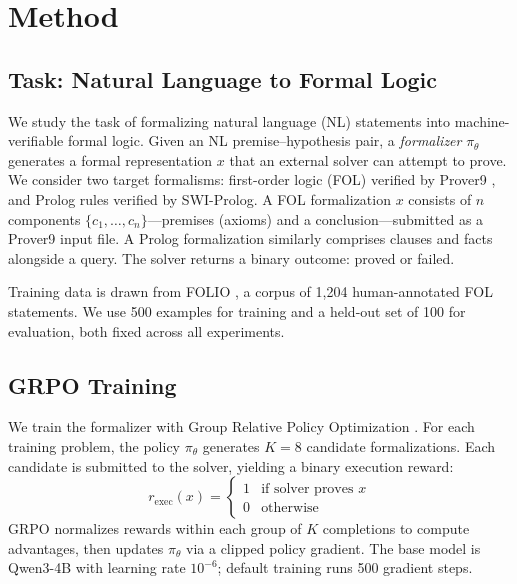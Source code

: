 \section{Method}
\label{sec:method}

\subsection{Task: Natural Language to Formal Logic}
\label{sec:task}

We study the task of formalizing natural language (NL) statements into machine-verifiable formal logic.
Given an NL premise--hypothesis pair, a \emph{formalizer} $\pi_\theta$ generates a formal representation $x$ that an external solver can attempt to prove.
We consider two target formalisms: first-order logic (FOL) verified by Prover9 \cite{mccune2010prover9}, and Prolog rules verified by SWI-Prolog.
A FOL formalization $x$ consists of $n$ components $\{c_1, \ldots, c_n\}$---premises (axioms) and a conclusion---submitted as a Prover9 input file.
A Prolog formalization similarly comprises clauses and facts alongside a query.
The solver returns a binary outcome: proved or failed.

Training data is drawn from FOLIO \cite{folio}, a corpus of 1{,}204 human-annotated FOL statements.
We use 500 examples for training and a held-out set of 100 for evaluation, both fixed across all experiments.

\subsection{GRPO Training}
\label{sec:grpo}

We train the formalizer with Group Relative Policy Optimization \cite[GRPO;][]{deepseekmath}.
For each training problem, the policy $\pi_\theta$ generates $K{=}8$ candidate formalizations.
Each candidate is submitted to the solver, yielding a binary execution reward:
\begin{equation}
  r_{\text{exec}}(x) =
  \begin{cases}
    1 & \text{if solver proves } x \\
    0 & \text{otherwise}
  \end{cases}
  \label{eq:r_exec}
\end{equation}
GRPO normalizes rewards within each group of $K$ completions to compute advantages, then updates $\pi_\theta$ via a clipped policy gradient.
The base model is Qwen3-4B with learning rate $10^{-6}$; default training runs 500 gradient steps.

